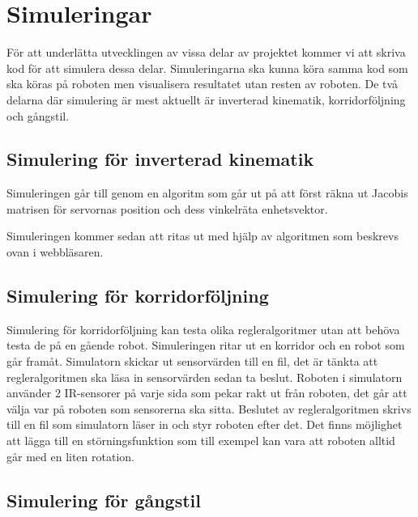 \documentclass[a4paper,titlepage,12pt]{article}
\begin{document}
	\section{Simuleringar}
	För att underlätta utvecklingen av vissa delar av projektet kommer vi att skriva
	kod för att simulera dessa delar. Simuleringarna ska kunna köra samma kod som ska
	köras på roboten men visualisera resultatet utan resten av roboten. De två
	delarna där simulering är mest aktuellt är inverterad kinematik, korridorföljning 
	och gångstil.

	\subsection{Simulering för inverterad kinematik}
	Simuleringen går till genom en algoritm som går ut på att först räkna ut Jacobis matrisen för servornas position och dess vinkelräta enhetsvektor.
	
	Simuleringen kommer sedan att ritas ut med hjälp av algoritmen som beskrevs ovan i webbläsaren.
	
	\subsection{Simulering för korridorföljning}
	Simulering för korridorföljning kan testa olika regleralgoritmer utan att behöva testa 
	de på en gående robot. Simuleringen ritar ut en korridor och en robot som går framåt. 
	Simulatorn skickar ut sensorvärden till en fil, det är tänkta att regleralgoritmen ska 
	läsa in sensorvärden sedan ta beslut. Roboten i simulatorn använder 2 IR-sensorer på varje 
	sida som pekar rakt ut från roboten, det går att välja var på roboten som sensorerna ska 
	sitta. Beslutet av regleralgoritmen skrivs till en fil som simulatorn läser in och 
	styr roboten efter det. Det finns möjlighet att lägga till en störningsfunktion som till 
	exempel kan vara att roboten alltid går med en liten rotation. 
	
	\subsection{Simulering för gångstil}
\end{document}
